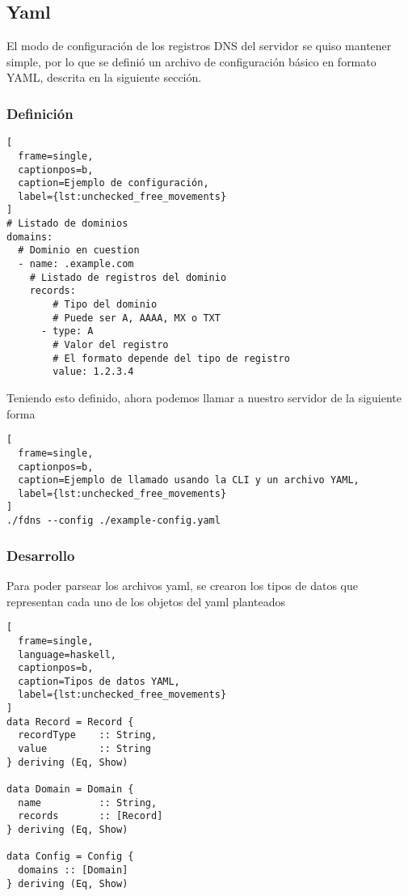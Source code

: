 \documentclass[6pt]{article}
\begin{document}
\subsection{Yaml \cite{package-yaml}}

El modo de configuración de los registros DNS del servidor se quiso
mantener simple, por lo que se definió un archivo de configuración
básico en formato YAML, descrita en la siguiente sección.

\subsubsection{Definición}

\clearpage
\begin{lstlisting}[
  frame=single,
  captionpos=b,
  caption=Ejemplo de configuración,
  label={lst:unchecked_free_movements}
]
# Listado de dominios
domains:
  # Dominio en cuestion
  - name: .example.com
    # Listado de registros del dominio
    records:
        # Tipo del dominio
        # Puede ser A, AAAA, MX o TXT
      - type: A
        # Valor del registro
        # El formato depende del tipo de registro
        value: 1.2.3.4
\end{lstlisting}

Teniendo esto definido, ahora podemos llamar a nuestro
servidor de la siguiente forma

\begin{lstlisting}[
  frame=single,
  captionpos=b,
  caption=Ejemplo de llamado usando la CLI y un archivo YAML,
  label={lst:unchecked_free_movements}
]
./fdns --config ./example-config.yaml
\end{lstlisting}

\subsubsection{Desarrollo}

Para poder parsear los archivos yaml, se crearon los tipos de datos
que representan cada uno de los objetos del yaml planteados

\begin{lstlisting}[
  frame=single,
  language=haskell,
  captionpos=b,
  caption=Tipos de datos YAML,
  label={lst:unchecked_free_movements}
]
data Record = Record {
  recordType    :: String,
  value         :: String
} deriving (Eq, Show)

data Domain = Domain {
  name          :: String,
  records       :: [Record]
} deriving (Eq, Show)

data Config = Config {
  domains :: [Domain]
} deriving (Eq, Show)
\end{lstlisting}
\end{document}
